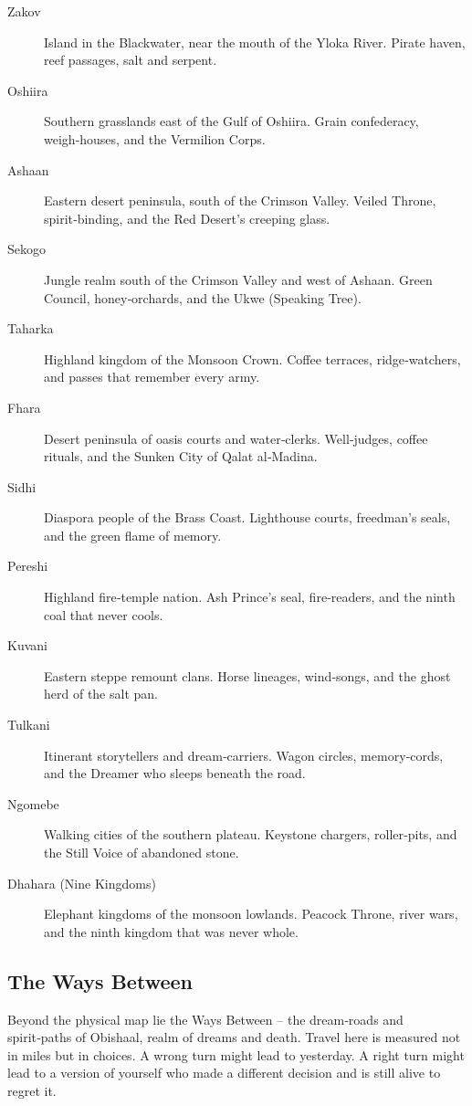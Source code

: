 \begin{description}
  \item[Zakov]  Island in the Blackwater, near the mouth of the Yloka River. Pirate haven, reef passages, salt and serpent.
  \item[Oshiira]  Southern grasslands east of the Gulf of Oshiira. Grain confederacy, weigh‑houses, and the Vermilion Corps.
  \item[Ashaan]  Eastern desert peninsula, south of the Crimson Valley. Veiled Throne, spirit‑binding, and the Red Desert's creeping glass.
  \item[Sekogo]  Jungle realm south of the Crimson Valley and west of Ashaan. Green Council, honey‑orchards, and the Ukwe (Speaking Tree).
  \item[Taharka]  Highland kingdom of the Monsoon Crown. Coffee terraces, ridge‑watchers, and passes that remember every army.
  \item[Fhara]  Desert peninsula of oasis courts and water‑clerks. Well‑judges, coffee rituals, and the Sunken City of Qalat al‑Madina.
  \item[Sidhi]  Diaspora people of the Brass Coast. Lighthouse courts, freedman's seals, and the green flame of memory.
  \item[Pereshi]  Highland fire‑temple nation. Ash Prince's seal, fire‑readers, and the ninth coal that never cools.
  \item[Kuvani]  Eastern steppe remount clans. Horse lineages, wind‑songs, and the ghost herd of the salt pan.
  \item[Tulkani]  Itinerant storytellers and dream‑carriers. Wagon circles, memory‑cords, and the Dreamer who sleeps beneath the road.
  \item[Ngomebe]  Walking cities of the southern plateau. Keystone chargers, roller‑pits, and the Still Voice of abandoned stone.
  \item[Dhahara (Nine Kingdoms)]  Elephant kingdoms of the monsoon lowlands. Peacock Throne, river wars, and the ninth kingdom that was never whole.
\end{description}

\subsection*{The Ways Between}
\label{sec:ways-between}

Beyond the physical map lie the Ways Between -- the dream‑roads and spirit‑paths of Obishaal, realm of dreams and death. Travel here is measured not in miles but in choices. A wrong turn might lead to yesterday. A right turn might lead to a version of yourself who made a different decision and is still alive to regret it.


